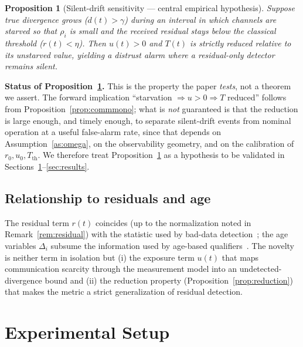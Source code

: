 \documentclass[journal]{IEEEtran}
\theoremstyle{plain}
\newtheorem{proposition}{Proposition}
\theoremstyle{definition}
\theoremstyle{remark}
\begin{document}
\begin{proposition}[Silent-drift sensitivity --- central empirical hypothesis]
\label{prop:hypothesis}
Suppose true divergence grows ($d(t)>\gamma$) during an interval in which
channels are starved so that $\rho_i$ is small and the received residual
stays below the classical threshold ($r(t)<\eta$). Then $u(t)>0$ and
$T(t)$ is strictly reduced relative to its unstarved value, yielding a
distrust alarm where a residual-only detector remains silent.
\end{proposition}

\noindent\textbf{Status of Proposition~\ref{prop:hypothesis}.} This is the
property the paper \emph{tests}, not a theorem we assert. The forward
implication ``starvation $\Rightarrow u>0 \Rightarrow T$ reduced'' follows
from Proposition~\ref{prop:commmono}; what is \emph{not} guaranteed is
that the reduction is large enough, and timely enough, to separate
silent-drift events from nominal operation at a useful false-alarm rate,
since that depends on Assumption~\ref{as:omega}, on the observability
geometry, and on the calibration of $r_0,u_0,T_{\mathrm{th}}$. We
therefore treat Proposition~\ref{prop:hypothesis} as a hypothesis to be
validated in Sections~\ref{sec:setup}--\ref{sec:results}.

\subsection{Relationship to residuals and age}
The residual term $r(t)$ coincides (up to the normalization noted in
Remark~\ref{rem:residual}) with the statistic used by bad-data
detection~\cite{abur2004,handschin1975,gol2014lav}; the age variables
$\Delta_i$ subsume the information used by age-based
qualifiers~\cite{duran2023,cosandal2026}. The novelty is neither term in
isolation but (i) the exposure term $u(t)$ that maps communication
scarcity through the measurement model into an undetected-divergence bound
and (ii) the reduction property (Proposition~\ref{prop:reduction}) that
makes the metric a strict generalization of residual detection.

\section{Experimental Setup}
\label{sec:setup}
\end{document}
